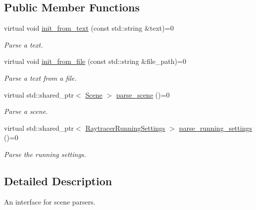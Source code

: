 \subsection*{Public Member Functions}
\begin{DoxyCompactItemize}
\item 
virtual void \mbox{\hyperlink{classomg_1_1_parser_af47d9c929199cbf845d3150defc499f0}{init\+\_\+from\+\_\+text}} (const std\+::string \&text)=0
\begin{DoxyCompactList}\small\item\em Parse a text. \end{DoxyCompactList}\item 
virtual void \mbox{\hyperlink{classomg_1_1_parser_aa0c44ed0f01edc2958667589d66ebe8a}{init\+\_\+from\+\_\+file}} (const std\+::string \&file\+\_\+path)=0
\begin{DoxyCompactList}\small\item\em Parse a text from a file. \end{DoxyCompactList}\item 
\mbox{\label{classomg_1_1_parser_aa0647c32291684d2624a024119af7070}} 
virtual std\+::shared\+\_\+ptr$<$ \mbox{\hyperlink{classomg_1_1_scene}{Scene}} $>$ \mbox{\hyperlink{classomg_1_1_parser_aa0647c32291684d2624a024119af7070}{parse\+\_\+scene}} ()=0
\begin{DoxyCompactList}\small\item\em Parse a scene. \end{DoxyCompactList}\item 
\mbox{\label{classomg_1_1_parser_a744a7e5e95d3b658653e8f1cb82eb9cb}} 
virtual std\+::shared\+\_\+ptr$<$ \mbox{\hyperlink{structomg_1_1_raytracer_running_settings}{Raytracer\+Running\+Settings}} $>$ \mbox{\hyperlink{classomg_1_1_parser_a744a7e5e95d3b658653e8f1cb82eb9cb}{parse\+\_\+running\+\_\+settings}} ()=0
\begin{DoxyCompactList}\small\item\em Parse the running settings. \end{DoxyCompactList}\end{DoxyCompactItemize}


\subsection{Detailed Description}
An interface for scene parsers. 

